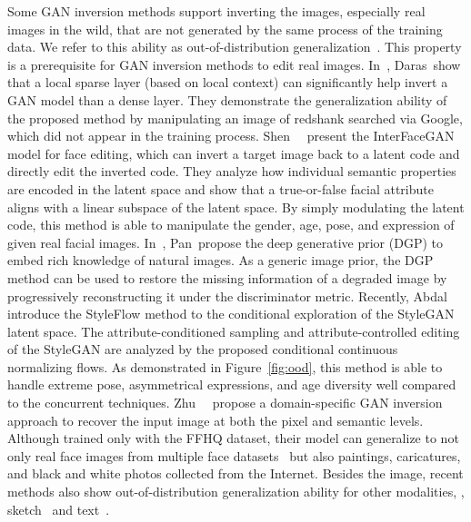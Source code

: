Some GAN inversion methods support inverting the images, especially real images in the wild, that are not generated by the same process of the training data.
We refer to this ability as out-of-distribution generalization~\cite{ren2019likelihood,hendrycks2016baseline,lee2018simple}.
This property is a prerequisite for GAN inversion methods to edit real images.
In~\cite{daras2020your}, Daras~\etal show that a local sparse layer (based on local context) can significantly help invert a GAN model than a dense layer. 
They demonstrate the generalization ability of the proposed method by manipulating an image of redshank searched via Google, which did not appear in the training process. 
Shen~\etal~\cite{shen2020interpreting} present the InterFaceGAN model for face editing, which can invert a target image back to a latent code and directly edit the inverted code.
They analyze how individual semantic properties are encoded in the latent space and show that a true-or-false facial attribute aligns with a linear subspace of the latent space. 
By simply modulating the latent code, this method is able to manipulate the gender, age, pose, and expression of given real facial images.
In~\cite{pan2020exploiting}, Pan~\etal propose the deep generative prior (DGP) to embed rich knowledge of natural images.
As a generic image prior, the DGP method can be used to restore the missing information of a degraded image by progressively reconstructing it under the discriminator metric.
Recently, Abdal~\etal~\cite{abdal2020styleflow} introduce the StyleFlow method to the conditional exploration of the StyleGAN latent space. 
The attribute-conditioned sampling and attribute-controlled editing of the StyleGAN are analyzed by the proposed conditional continuous normalizing flows. 
As demonstrated in Figure~\ref{fig:ood}, this method is able to handle extreme pose, asymmetrical expressions, and age diversity well compared to the concurrent techniques.
Zhu~\etal~\cite{zhu2020indomain} propose a domain-specific GAN inversion approach to recover the input image at both the pixel and semantic levels.
Although trained only with the FFHQ dataset, their model can generalize to not only real face images from multiple face datasets~\cite{chelnokova2014rewards, courset2018caucasian, yi2019apdrawinggan} but also paintings, caricatures, and black and white photos collected from the Internet.
Besides the image, recent methods also show out-of-distribution generalization ability for other modalities, \ie, sketch~\cite{richardson2020encoding} and text~\cite{xia2021tedigan}.

\figood